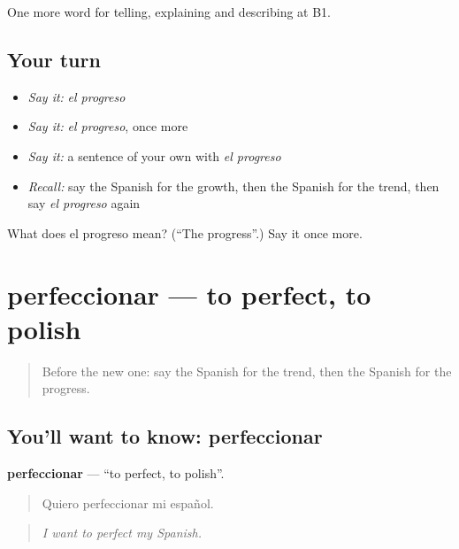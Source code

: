 \begin{grammarlens}[title={What you've built}]
One more word for telling, explaining and describing at B1.
\end{grammarlens}

\subsection*{Your turn}
\begin{itemize}
\raggedright
  \item \emph{Say it:} \emph{el progreso}
  \item \emph{Say it:} \emph{el progreso}, once more
  \item \emph{Say it:} a sentence of your own with \emph{el progreso}
  \item \emph{Recall:} say the Spanish for the growth, then the Spanish for the trend, then say \emph{el progreso} again
\end{itemize}

\begin{tcolorbox}[breakable,colback=teal!4,colframe=teal!35!black,title={Before you move on}]
What does el progreso mean? (\textquotedblleft{}The progress\textquotedblright{}.) Say it once more.
\end{tcolorbox}
\section[perfeccionar]{perfeccionar — to perfect, to polish}

\label{lesson:ES-C609-perfeccionar}



\begin{quote}
Before the new one: say the Spanish for the trend, then the Spanish for the progress.
\end{quote}

\subsection*{You'll want to know: perfeccionar}
\textbf{perfeccionar} — \textquotedblleft{}to perfect, to polish\textquotedblright{}.

\begin{quote}
Quiero perfeccionar mi español.
\end{quote}

\begin{quote}
\emph{I want to perfect my Spanish.}
\end{quote}

